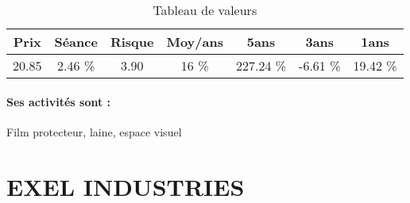 \documentclass[11pt,a4paper]{report}%
\begin{document}
\begin{table}[H]
  \centering
    \begin{tabular}{|c|c|c|c|c|c|c|}
    \hline
    Prix & Séance & Risque  & Moy/ans & 5ans & 3ans & 1ans \\
    \hline
    20.85 &    2.46 \%    & 3.90 & 16 \% & 227.24 \% & -6.61 \% & 19.42 \% \\
    \hline
    \end{tabular}%
        \label{tab:table_CHARGEURS}%
      \caption{Tableau de valeurs}
\end{table}%

\paragraph{Ses activités sont : } Film protecteur, laine, espace visuel 
    
    \newpage

\section{EXEL INDUSTRIES}
\end{document}
